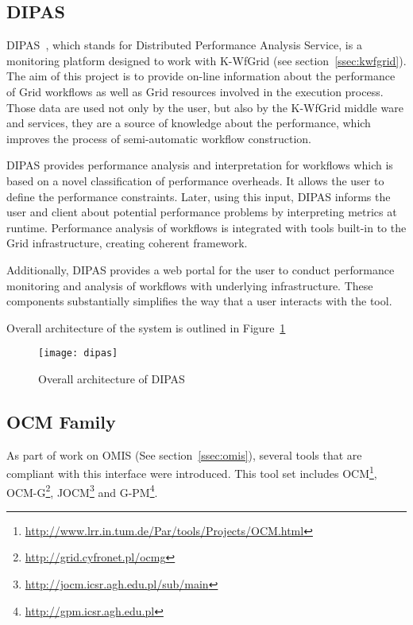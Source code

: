 
\subsection{DIPAS}

DIPAS~\cite{DIPAS}, which stands for Distributed Performance Analysis Service, is a monitoring platform designed to work with K-WfGrid (see section~\ref{ssec:kwfgrid}). The aim of this project is to provide on-line information about the performance of Grid workflows as well as Grid resources involved in the execution process. Those data are used not only by the user, but also by the K-WfGrid middle ware and services, they are a source of knowledge about the performance, which improves the process of semi-automatic workflow construction.

DIPAS provides performance analysis and interpretation for workflows which is based on a novel classification of performance overheads. It allows the user to define the performance constraints. Later, using this input, DIPAS informs the user and client about potential performance problems by interpreting metrics at runtime. Performance analysis of workflows is integrated with tools built-in to the Grid infrastructure, creating coherent framework.

Additionally, DIPAS provides a web portal for the user to conduct performance monitoring and analysis of workflows with underlying infrastructure. These components substantially simplifies the way that a user interacts with the tool.

Overall architecture of the system is outlined in Figure~\ref{fig:dipas}

\begin{figure}[ht]

\centering

\texttt{[image: dipas]} \caption{Overall architecture of DIPAS} \label{fig:dipas}

\end{figure}


\subsection{OCM Family}

As part of work on OMIS (See section~\ref{ssec:omis}), several tools that are compliant with this interface were introduced. This tool set includes OCM\footnote{\url{http://www.lrr.in.tum.de/Par/tools/Projects/OCM.html}}, OCM-G\footnote{\url{http://grid.cyfronet.pl/ocmg}}, JOCM\footnote{\url{http://jocm.icsr.agh.edu.pl/sub/main}} and G-PM\footnote{\url{http://gpm.icsr.agh.edu.pl}}.

